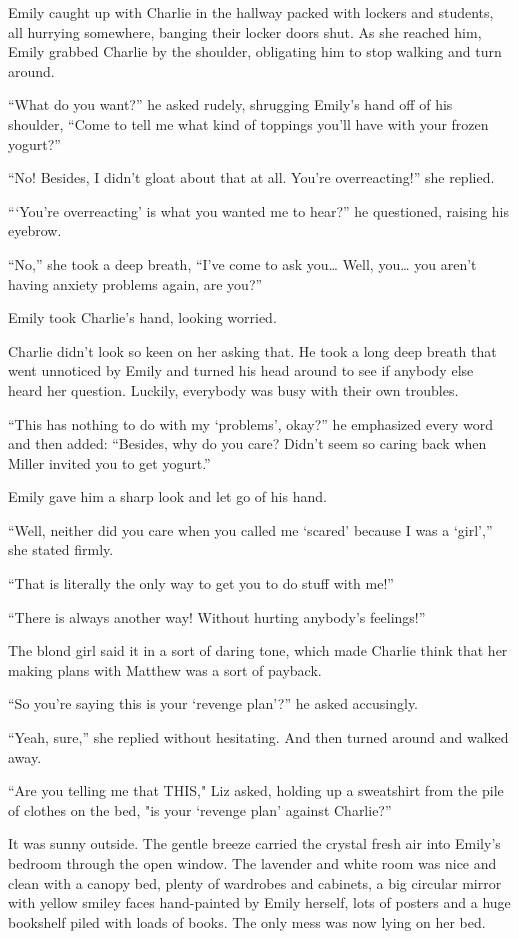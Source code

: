 Emily caught up with Charlie in the hallway packed with lockers and students, all hurrying somewhere, banging their locker doors shut. As she reached him, Emily grabbed Charlie by the shoulder, obligating him to stop walking and turn around.

“What do you want?” he asked rudely, shrugging Emily’s hand off of his shoulder, “Come to tell me what kind of toppings you’ll have with your frozen yogurt?”

“No! Besides, I didn’t gloat about that at all. You’re overreacting!” she replied.

“‘You’re overreacting' is what you wanted me to hear?” he questioned, raising his eyebrow.

“No,” she took a deep breath, “I’ve come to ask you… Well, you… you aren’t having anxiety problems again, are you?”

Emily took Charlie’s hand, looking worried.

Charlie didn’t look so keen on her asking that. He took a long deep breath that went unnoticed by Emily and turned his head around to see if anybody else heard her question. Luckily, everybody was busy with their own troubles.

“This has nothing to do with my ‘problems’, okay?” he emphasized every word and then added: “Besides, why do you care? Didn’t seem so caring back when Miller invited you to get yogurt.”

Emily gave him a sharp look and let go of his hand.

“Well, neither did you care when you called me ‘scared’ because I was a ‘girl’,” she stated firmly.

“That is literally the only way to get you to do stuff with me!”

“There is always another way! Without hurting anybody’s feelings!”

The blond girl said it in a sort of daring tone, which made Charlie think that her making plans with Matthew was a sort of payback.

“So you’re saying this is your ‘revenge plan’?” he asked accusingly.

“Yeah, sure,” she replied without hesitating. And then turned around and walked away.

\bigskip

“Are you telling me that THIS," Liz asked, holding up a sweatshirt from the pile of clothes on the bed, "is your ‘revenge plan’ against Charlie?”

It was sunny outside. The gentle breeze carried the crystal fresh air into Emily’s bedroom through the open window. The lavender and white room was nice and clean with a canopy bed, plenty of wardrobes and cabinets, a big circular mirror with yellow smiley faces hand-painted by Emily herself, lots of posters and a huge bookshelf piled with loads of books. The only mess was now lying on her bed.

